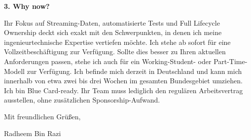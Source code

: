 \documentclass[11pt,a4paper]{coverletter}
\begin{document}
\vspace{8pt}\noindent\textbf{3. Why now?}\par\vspace{3pt}

Ihr Fokus auf Streaming-Daten, automatisierte Tests und Full Lifecycle Ownership deckt sich exakt mit den Schwerpunkten, in denen ich meine ingenieurtechnische Expertise vertiefen möchte. Ich stehe ab sofort für eine Vollzeitbeschäftigung zur Verfügung. Sollte dies besser zu Ihren aktuellen Anforderungen passen, stehe ich auch für ein Working-Student- oder Part-Time-Modell zur Verfügung. Ich befinde mich derzeit in Deutschland und kann mich innerhalb von etwa zwei bis drei Wochen im gesamten Bundesgebiet umziehen. Ich bin Blue Card-ready. Ihr Team muss lediglich den regulären Arbeitsvertrag ausstellen, ohne zusätzlichen Sponsorship-Aufwand.

\closing{Mit freundlichen Grüßen,}{Radheem Bin Razi}
\end{document}
